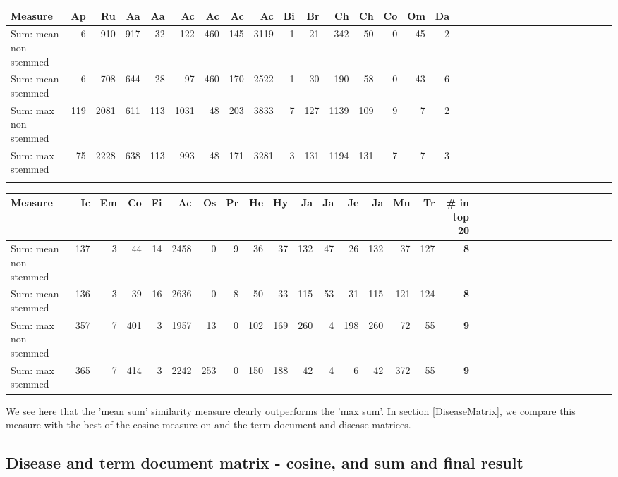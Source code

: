 \begin{table}[H]
\label{testResult_termDoc_orphan_hist_3000_ns_s_mea_max_sum}
\begin{tiny}
  \begin{tabular}{|l|r|r|r|r|r|r|r|r|r|r|r|r|r|r|r|r|r|r|r|r|r|r|r|r|r|r|r|r|r|r|r|}
    \hline
    Measure &Ap&Ru&Aa&Aa&Ac&Ac&Ac&Ac&Bi&Br&Ch&Ch&Co&Om&Da\\
    \hline
    Sum: mean non-stemmed &6&910&917&32&122&460&145&3119&1&21&342&50&0&45&2\\
    \hline
    Sum: mean stemmed &6&708&644&28&97&460&170&2522&1&30&190&58&0&43&6\\
    \hline
    Sum: max non-stemmed &119&2081&611&113&1031&48&203&3833&7&127&1139&109&9&7&2\\
    \hline
    Sum: max stemmed &75&2228&638&113&993&48&171&3281&3&131&1194&131&7&7&3 \\
    \hline
    \multicolumn{16}{c}{} \\
    \end{tabular}
    \begin{tabular}{|l|r|r|r|r|r|r|r|r|r|r|r|r|r|r|r|r|r|r|r|r|r|r|r|r|r|r|r|r|r|r|}
    \hline
     Measure &Ic&Em&Co&Fi&Ac&Os&Pr&He&Hy&Ja&Ja&Je&Ja&Mu&Tr &\scriptsize{\textbf{\# in top 20}} \\
    \hline
    Sum: mean non-stemmed &137&3&44&14&2458&0&9&36&37&132&47&26&132&37&127 & \scriptsize{\textbf{8}} \\
    \hline
    Sum: mean stemmed &136&3&39&16&2636&0&8&50&33&115&53&31&115&121&124 & \scriptsize{\textbf{8}} \\
    \hline
    Sum: max non-stemmed &357&7&401&3&1957&13&0&102&169&260&4&198&260&72&55 & \scriptsize{\textbf{9}} \\
    \hline
    Sum: max stemmed &365&7&414&3&2242&253&0&150&188&42&4&6&42&372&55 & \scriptsize{\textbf{9}} \\
    \hline
  \end{tabular}
\end{tiny}
\end{table}

We see here that the 'mean sum' similarity measure clearly outperforms the 'max sum'. 
In section \ref{DiseaseMatrix}, we compare this measure with the best of the cosine 
measure on and the term document and disease matrices.

\subsection{Disease and term document matrix - cosine, and sum and final result}

